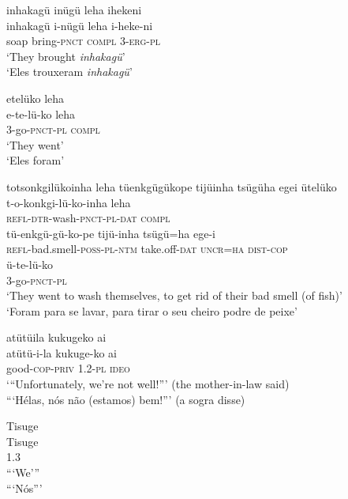 \documentclass[output=paper,
modfonts,nonflat
]{langsci/langscibook}
\begin{document}
\ea inhakagü inügü leha ihekeni \\[.3em]
\gll inhakagü i-nügü leha i-heke-ni \\
soap bring-\textsc{pnct} \textsc{compl} 3-\textsc{erg-pl} \\
\glt ‘They brought \emph{inhakagü}’ \\
‘Eles trouxeram \emph{inhakagü}’ \\
\z

\newpage 
\ea etelüko leha \\[.3em]
\gll e-te-lü-ko		leha \\
3-go-\textsc{pnct-pl} \textsc{compl} \\
\glt ‘They went’ \\
‘Eles foram’ \\
\z


\ea totsonkgilükoinha leha tüenkgügükope tijüinha tsügüha egei ütelüko \\[.3em]
\gll t-o-konkgi-lü-ko-inha		leha  \\
\textsc{refl-dtr}-wash-\textsc{pnct-pl-dat} 	\textsc{compl} \\
\gll tü-enkgü-gü-ko-pe 			tijü-inha 	tsügü=ha	ege-i  \\
\textsc{refl-}bad.smell-\textsc{poss-pl-ntm} 	take.off-\textsc{dat} 	\textsc{uncr=ha} 	\textsc{dist-cop}  \\
\gll ü-te-lü-ko \\
3-go-\textsc{pnct-pl} \\
\glt ‘They went to wash themselves, to get rid of their bad smell (of fish)’ \\
‘Foram para se lavar, para tirar o seu cheiro podre de peixe’ \\
\z

\ea atütüila kukugeko ai \\ [.6em]
\gll atütü-i-la 		kukuge-ko 	ai \\
good-\textsc{cop-priv} 	\textsc{1.2-pl} 		\textsc{ideo} \\
\glt‘“Unfortunately, we're not well!”’ (the mother-in-law said) \\
“‘Hélas, nós não (estamos) bem!”’ (a sogra disse) \\
\z

 
\ea Tisuge{\footnotemark}{} \\[.3em]
\gll Tisuge \\
1.3 \\
\glt “‘We’” \\
“‘Nós”’ 
\z
\end{document}

